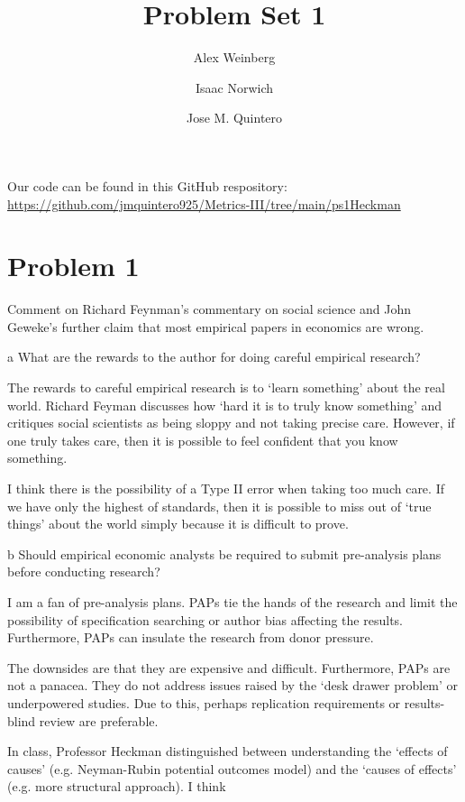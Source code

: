 \documentclass{article}
\title{Problem Set 1}
\author{Alex Weinberg \and Isaac Norwich \and Jose M. Quintero}
\begin{document}
\maketitle

Our code can be found in this GitHub respository: \url{https://github.com/jmquintero925/Metrics-III/tree/main/ps1Heckman}


\section*{Problem 1}
Comment on Richard Feynman’s commentary on social science and John Geweke’s further claim that most empirical papers in economics are wrong.
\begin{problem}{a}
What are the rewards to the author for doing careful empirical research?
\end{problem}

\begin{solution}
The rewards to careful empirical research is to `learn something' about the real world. 
Richard Feyman discusses how `hard it is to truly know something' and critiques social scientists as being sloppy and not taking precise care. However, if one truly takes care, then it is possible to feel confident that you know something. 

I think there is the possibility of a Type II error when taking too much care. If we have only the highest of standards, then it is possible to miss out of `true things' about the world simply because it is difficult to prove. 
\end{solution}

\begin{problem}{b}
Should empirical economic analysts be required to submit pre-analysis
plans before conducting research?
\end{problem}

\begin{solution}

I am a fan of pre-analysis plans. PAPs tie the hands of the research and limit the possibility of specification searching or author bias affecting the results. Furthermore, PAPs can insulate the research from donor pressure.

The downsides are that they are expensive and difficult. Furthermore, PAPs are not a panacea. They do not address issues raised by the `desk drawer problem' or underpowered studies. Due to this, perhaps replication requirements or results-blind review are preferable. 




In class, Professor Heckman distinguished between understanding the `effects of causes' (e.g. Neyman-Rubin potential outcomes model) and the `causes of effects' (e.g. more structural approach). I think 

\end{solution}
\end{document}
